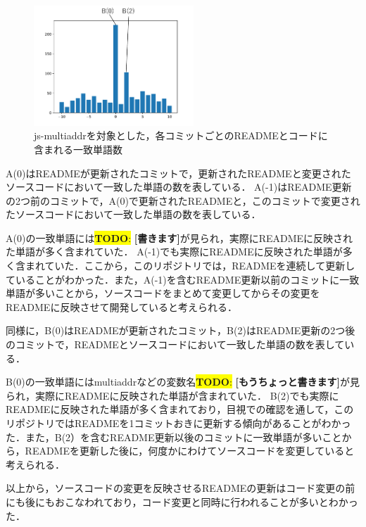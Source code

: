 \documentclass[uplatex,dvipdfmx,a4paper,twocolumn,base=11pt,jbase=11pt,ja=standard]{bxjsarticle}  %
\newcommand{\todo}[1]{\colorbox{yellow}{{\bf TODO}:}{\color{red} {\textbf{[#1]}}}}
\begin{document}
\vspace{-1cm}
\begin{figure}[h]
\begin{center}
\includegraphics[width=6cm]{IPSJ202303_Shirasaki/draft/use_js.pdf}
\caption{js-multiaddrを対象とした，各コミットごとのREADMEとコードに含まれる一致単語数}
\end{center}
\end{figure}

\vspace{-5mm}
A(0)はREADMEが更新されたコミットで，更新されたREADMEと変更されたソースコードにおいて一致した単語の数を表している．
A(-1)はREADME更新の2つ前のコミットで，A(0)で更新されたREADMEと，このコミットで変更されたソースコードにおいて一致した単語の数を表している．

A(0)の一致単語には\todo{書きます}が見られ，実際にREADMEに反映された単語が多く含まれていた．
A(-1)でも実際にREADMEに反映された単語が多く含まれていた．ここから，このリポジトリでは，READMEを連続して更新していることがわかった．また，A(-1)を含むREADME更新以前のコミットに一致単語が多いことから，ソースコードをまとめて変更してからその変更をREADMEに反映させて開発していると考えられる．



同様に，B(0)はREADMEが更新されたコミット，B(2)はREADME更新の2つ後のコミットで，READMEとソースコードにおいて一致した単語の数を表している．

B(0)の一致単語にはmultiaddrなどの変数名\todo{もうちょっと書きます}が見られ，実際にREADMEに反映された単語が含まれていた．
B(2)でも実際にREADMEに反映された単語が多く含まれており，目視での確認を通して，このリポジトリではREADMEを1コミットおきに更新する傾向があることがわかった．また，B(2）を含むREADME更新以後のコミットに一致単語が多いことから，READMEを更新した後に，何度かにわけてソースコードを変更していると考えられる．

以上から，ソースコードの変更を反映させるREADMEの更新はコード変更の前にも後にもおこなわれており，コード変更と同時に行われることが多いとわかった．
\end{document}
